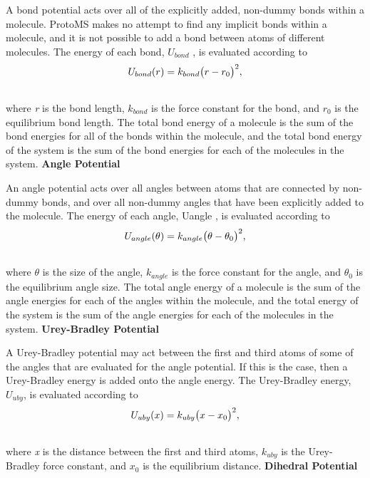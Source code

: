 \documentclass[letterpaper,10pt,english]{manual}
\begin{document}
A bond potential acts over all of the explicitly added, non-dummy bonds within a molecule. ProtoMS makes no attempt to find any implicit bonds within a molecule, and it is not possible to add a bond between atoms of different molecules. The energy of each bond, $U_{bond}$ , is evaluated according to
\hypertarget{equation-bondpot}{}\begin{gather}
\begin{split}U_{bond}(r) = k_{bond}\bigl(r-r_0\bigr)^2,\end{split}\label{protoms-bondpot}\\\begin{split}\end{split}\notag
\end{gather}
where \emph{r} is the bond length, $k_{bond}$ is the force constant for the bond, and $r_0$ is the equilibrium bond length. The total bond energy of a molecule is the sum of the bond energies for all of the bonds within the molecule, and the total bond energy of the system is the sum of the bond energies for each of the molecules in the system.
\textbf{Angle Potential}

An angle potential acts over all angles between atoms that are connected by non-dummy bonds, and over all
non-dummy angles that have been explicitly added to the molecule. The energy of each angle, Uangle , is evaluated
according to
\hypertarget{equation-angpot}{}\begin{gather}
\begin{split}U_{angle}(\theta) = k_{angle}\bigl(\theta-\theta_0\bigr)^2,\end{split}\label{protoms-angpot}\\\begin{split}\end{split}\notag
\end{gather}
where $\theta$ is the size of the angle, $k_{angle}$ is the force constant for the angle, and $\theta_0$ is the equilibrium angle size. The total angle energy of a molecule is the sum of the angle energies for each of the angles within the molecule, and the total energy of the system is the sum of the angle energies for each of the molecules in the system.
\textbf{Urey-Bradley Potential}

A Urey-Bradley potential may act between the first and third atoms of some of the angles that are evaluated for the angle potential. If this is the case, then a Urey-Bradley energy is added onto the angle energy. The Urey-Bradley energy, $U_{uby}$, is evaluated according to
\hypertarget{equation-ubpot}{}\begin{gather}
\begin{split}U_{uby}(x) = k_{uby}\bigl(x-x_0\bigr)^2,\end{split}\label{protoms-ubpot}\\\begin{split}\end{split}\notag
\end{gather}
where \emph{x} is the distance between the first and third atoms, $k_{uby}$ is the Urey-Bradley force constant, and $x_0$ is the equilibrium distance.
\textbf{Dihedral Potential}
\end{document}
